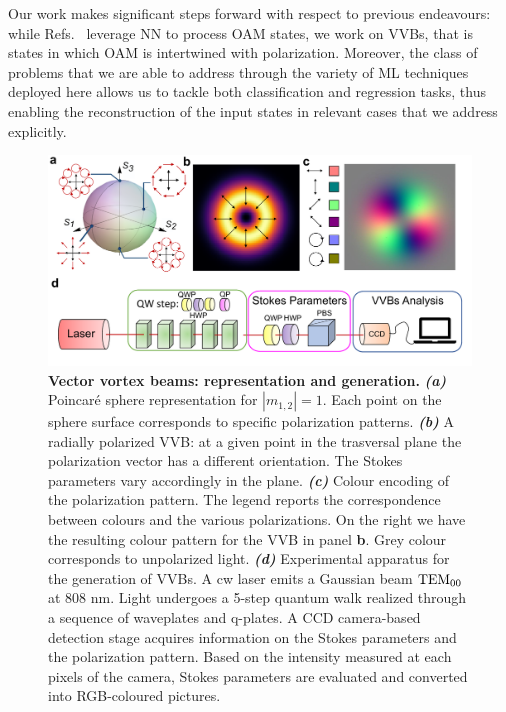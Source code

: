 Our work makes significant steps forward  with respect to previous endeavours: while Refs.~\cite{krenn2014communication,krenn2016twisted,doster2017machine, park2018demultiplexing, lohani2018turbulence, li2018joint} leverage NN to process OAM states, we work on VVBs, that is states in which OAM is intertwined with polarization. Moreover, the class of problems that we are able to address through the variety of ML techniques deployed here allows us to tackle both classification and regression tasks, thus enabling the reconstruction of the input states in relevant cases that we address explicitly.


\begin{figure}[t]
	\centering
    \includegraphics[width=\textwidth]{Figures/quantum-walks/VVBs-VVBschemaQW.pdf}
    \caption{
    	\textbf{Vector vortex beams: representation and generation.}
		\textbf{\emph{(a)}}
		Poincar\'e sphere representation for $|m_{1,2}|=1$. Each point on the sphere surface corresponds to specific polarization patterns. 
		\textbf{\emph{(b)}}
		A radially polarized \ac{VVB}: at a given point in the trasversal plane the polarization vector has a different orientation. The Stokes parameters vary accordingly in the plane.
		\textbf{\emph{(c)}}
		Colour encoding of the polarization pattern. 
		The legend reports the correspondence between colours and the various polarizations.
		On the right we have the resulting colour pattern for the VVB in panel {\bf b}. Grey colour 
		corresponds to unpolarized light.
		\textbf{\emph{(d)}}
		Experimental apparatus for the generation of \acp{VVB}. A cw laser emits a Gaussian beam $\operatorname{TEM}_{00}$ at $808$ nm. Light undergoes a 5-step quantum walk realized through a sequence of waveplates and q-plates. 
		A CCD camera-based detection stage acquires information on the Stokes parameters and the polarization pattern. Based on the intensity measured at each pixels of the  camera, Stokes parameters are evaluated and converted into RGB-coloured pictures.
	}
\label{fig:qw_poinc_sphere}
\end{figure}

